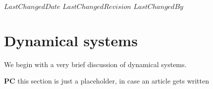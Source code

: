 {$LastChangedDate$}
{$LastChangedRevision$} {$LastChangedBy$}


\section{Dynamical systems}

We begin with a very brief discussion of dynamical systems.

{\bf PC}{ this section is just a placeholder, in case an article gets written}
